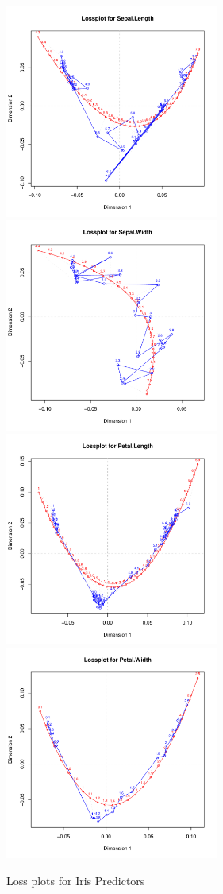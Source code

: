 \documentclass[article]{Z}
\begin{document}
\begin{figure}[hbt]
\begin{center}
\includegraphics[height=70mm, width=70mm]{irisLoss1.pdf}
\includegraphics[height=70mm, width=70mm]{irisLoss2.pdf}
\includegraphics[height=70mm, width=70mm]{irisLoss3.pdf}
\includegraphics[height=70mm, width=70mm]{irisLoss4.pdf}
\caption{\label{fig:irisLoss}Loss plots for Iris Predictors}
\end{center}
\end{figure}
\end{document}
